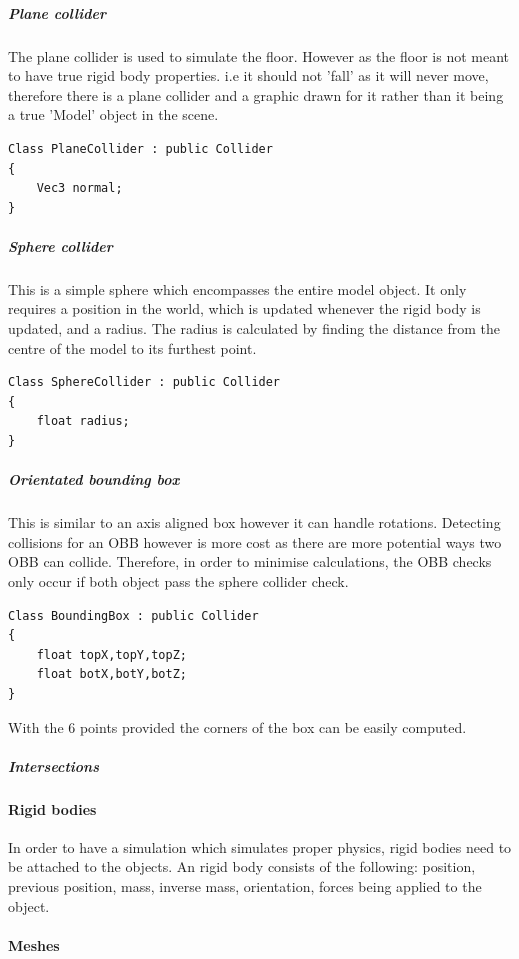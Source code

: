 \documentclass[conference,backref=page]{acmsiggraph}
\begin{document}
\subparagraph{Plane collider} \hfill

The plane collider is used to simulate the floor. However as the floor is not meant to have true rigid body properties. i.e it should not 'fall' as it will never move, therefore there is a plane collider and a graphic drawn for it rather than it being a true 'Model' object in the scene.

\begin{lstlisting}
Class PlaneCollider : public Collider
{
	Vec3 normal;
}
\end{lstlisting}

\subparagraph{Sphere collider}  \hfill 

This is a simple sphere which encompasses the entire model object. It only requires a position in the world, which is updated whenever the rigid body is updated, and a radius. The radius is calculated by finding the distance from the centre of the model to its furthest point. 

\begin{lstlisting}
Class SphereCollider : public Collider
{
	float radius;
}
\end{lstlisting}

\subparagraph{Orientated bounding box}\hfill 

This is similar to an axis aligned box however it can handle rotations. Detecting collisions for an OBB however is more cost as there are more potential ways two OBB can collide. Therefore, in order to minimise calculations, the OBB checks only occur if both object pass the sphere collider check. 

\begin{lstlisting}
Class BoundingBox : public Collider
{
	float topX,topY,topZ;
	float botX,botY,botZ;
}
\end{lstlisting}
With the 6 points provided the corners of the box can be easily computed.


\subparagraph{Intersections}


\paragraph{Rigid bodies} \hfill

In order to have a simulation which simulates proper physics, rigid bodies need to be attached to the objects. An rigid body consists of the following: position, previous position, mass, inverse mass, orientation, forces being applied to the object. 


\paragraph{Meshes} \hfill
\end{document}
